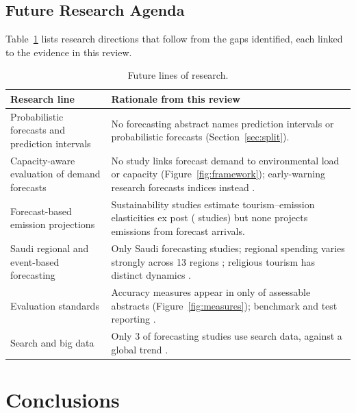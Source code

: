 \documentclass[11pt,a4paper]{article}
\begin{document}
\subsection{Future Research Agenda}
Table~\ref{tab:agenda} lists research directions that follow from the gaps identified, each linked to the evidence in this review.

\begin{table}[t]\centering\small
\caption{Future lines of research.}\label{tab:agenda}
\begin{tabularx}{\linewidth}{@{}p{4.2cm}X@{}}
\toprule
Research line & Rationale from this review\\
\midrule
Probabilistic forecasts and prediction intervals & No forecasting abstract names prediction intervals or probabilistic forecasts (Section~\ref{sec:split}).\\
Capacity-aware evaluation of demand forecasts & No study links forecast demand to environmental load or capacity (Figure~\ref{fig:framework}); early-warning research forecasts indices instead \citep{Ye2020,Long2022}.\\
Forecast-based emission projections & Sustainability studies estimate tourism--emission elasticities ex post (\NnS{} studies) but none projects emissions from forecast arrivals.\\
Saudi regional and event-based forecasting & Only \NsaudiF{} Saudi forecasting studies; regional spending varies strongly across 13 regions \citep{Alfehaid2026}; religious tourism has distinct dynamics \citep{Mabrouk2026}.\\
Evaluation standards & Accuracy measures appear in only \NFmetric{} of \NFabs{} assessable abstracts (Figure~\ref{fig:measures}); benchmark and test reporting \citep{Hyndman2021fpp,Diebold1995}.\\
Search and big data & Only 3 of \NnF{} forecasting studies use search data, against a global trend \citep{Wu2024}.\\
\bottomrule
\end{tabularx}
\end{table}

\section{Conclusions}
\end{document}
